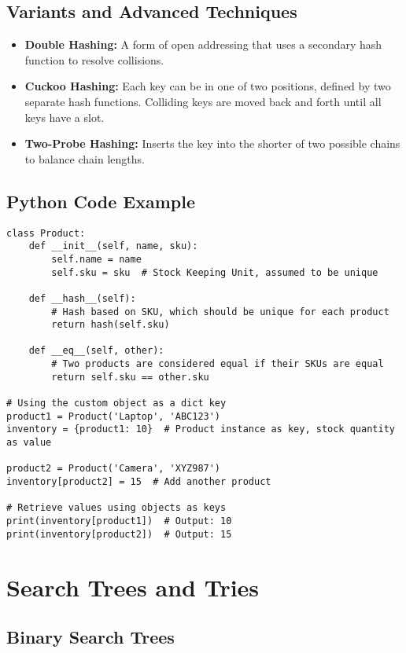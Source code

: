 \documentclass{article}
\begin{document}
\subsection{Variants and Advanced Techniques}
\begin{itemize}
    \item \textbf{Double Hashing:} A form of open addressing that uses a secondary hash function to resolve collisions.
    \item \textbf{Cuckoo Hashing:} Each key can be in one of two positions, defined by two separate hash functions. Colliding keys are moved back and forth until all keys have a slot.
    \item \textbf{Two-Probe Hashing:} Inserts the key into the shorter of two possible chains to balance chain lengths.
\end{itemize}

\subsection{Python Code Example}

\begin{verbatim}
class Product:
    def __init__(self, name, sku):
        self.name = name
        self.sku = sku  # Stock Keeping Unit, assumed to be unique

    def __hash__(self):
        # Hash based on SKU, which should be unique for each product
        return hash(self.sku)

    def __eq__(self, other):
        # Two products are considered equal if their SKUs are equal
        return self.sku == other.sku

# Using the custom object as a dict key
product1 = Product('Laptop', 'ABC123')
inventory = {product1: 10}  # Product instance as key, stock quantity as value

product2 = Product('Camera', 'XYZ987')
inventory[product2] = 15  # Add another product

# Retrieve values using objects as keys
print(inventory[product1])  # Output: 10
print(inventory[product2])  # Output: 15
\end{verbatim}

\section{Search Trees and Tries}

\subsection{Binary Search Trees}
\end{document}
